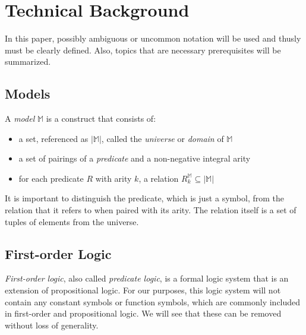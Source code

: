 \section{Technical Background}

	In this paper, possibly ambiguous or uncommon notation will be used and
	thusly must be clearly defined.  Also, topics that are necessary
	prerequisites will be summarized.

	\subsection{Models}

		A \emph{model} $\mathbb{M}$ is a construct that consists of:
		\begin{itemize}
		\item a set, referenced as $|\mathbb{M}|$, called the \emph{universe} or \emph{domain} of $\mathbb{M}$
		\item a set of pairings of a \emph{predicate} and a non-negative integral arity
		\item for each predicate $R$ with arity $k$, a relation $R^\mathbb{M}_k \subseteq |\mathbb{M}|$
		\end{itemize}
		It is important to distinguish the predicate, which is just a symbol,
		from the relation that it refers to when paired with its arity. The
		relation itself is a set of tuples of elements from the universe.

	\subsection{First-order Logic}

		\emph{First-order logic}, also called \emph{predicate logic}, is a
		formal logic system that is an extension of propositional logic. For
		our purposes, this logic system will not contain any constant symbols
		or function symbols, which are commonly included in first-order and
		propositional logic. We will see that these can be removed without loss
		of generality.

